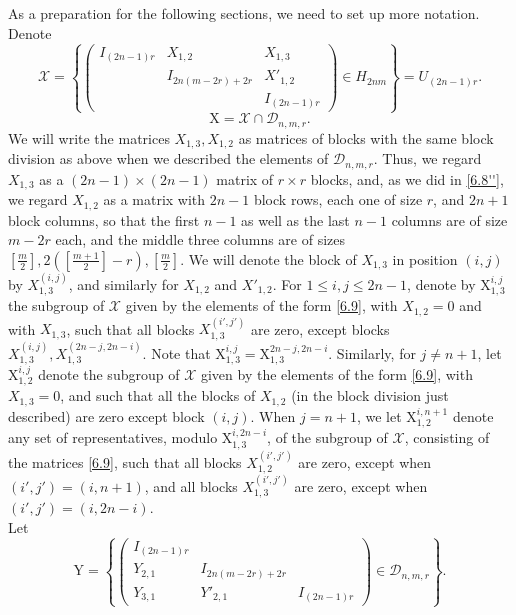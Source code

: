 \documentclass[12pts]{amsart}
\begin{document}
As a preparation for the following sections, we need to set
up more notation. Denote
\begin{equation}\label{6.9}
\mathcal{X}=\left\{\begin{pmatrix}I_{(2n-1)r}&X_{1,2}&X_{1,3}\\&I_{2n(m-2r)+2r}&X'_{1,2}\\
&&I_{(2n-1)r}\end{pmatrix}\in H_{2nm}\right\}=U_{(2n-1)r}.
\end{equation}
$$
\mathrm{X}=\mathcal{X}\cap \mathcal{D}_{n,m,r}.
$$
We will write the matrices $X_{1,3}, X_{1,2}$ as matrices of blocks
with the same block division as above when we described the elements
of $\mathcal{D}_{n,m,r}$. Thus, we regard $X_{1,3}$ as a
$(2n-1)\times (2n-1)$ matrix of $r\times r$ blocks, and, as we did in \eqref{6.8''}, we regard $X_{1,2}$ as
a matrix with $2n-1$ block rows, each one of size $r$, and $2n+1$
block columns, so that the first $n-1$ as well as the last $n-1$
columns are of size $m-2r$ each, and the middle three columns are of
sizes $[\frac{m}{2}], 2([\frac{m+1}{2}]-r), [\frac{m}{2}]$. We will denote the block of $X_{1,3}$ in position $(i,j)$ by $X_{1,3}^{(i,j)}$, and similarly for $X_{1,2}$ and
$X'_{1,2}$. For $1\leq i,j\leq 2n-1$, denote by
$\mathrm{X}_{1,3}^{i,j}$ the subgroup of $\mathcal{X}$ given by the
elements of the form \eqref{6.9}, with $X_{1,2}=0$ and with
$X_{1,3}$, such that all blocks $X_{1,3}^{(i',j')}$ are zero, except
blocks $X_{1,3}^{(i,j)}, X_{1,3}^{(2n-j,2n-i)}$. Note that $\mathrm{X}_{1,3}^{i,j}=\mathrm{X}_{1,3}^{2n-j,2n-i}$. Similarly, for $j\neq n+1$, let
$\mathrm{X}_{1,2}^{i,j}$ denote the subgroup of $\mathcal{X}$ given by
the elements of the form \eqref{6.9}, with $X_{1,3}=0$, and such
that all the blocks of $X_{1,2}$ (in the block division just
described) are zero except block $(i,j)$. When $j=n+1$, we let  $\mathrm{X}_{1,2}^{i,n+1}$ 
denote any set of representatives, modulo $\mathrm{X}_{1,3}^{i,2n-i}$, of the subgroup of $\mathcal{X}$,
consisting of the matrices \eqref{6.9}, such that all blocks $X_{1,2}^{(i',j')}$ are zero,
except when $(i',j')=(i,n+1)$, and all blocks $X_{1,3}^{(i',j')}$ are zero, except when $(i',j')=(i,2n-i)$.
 \\
Let
\begin{equation}\label{6.10}
\mathrm{Y}=\left\{\begin{pmatrix}I_{(2n-1)r}\\Y_{2,1}&I_{2n(m-2r)+2r}\\
Y_{3,1}&Y'_{2,1}&I_{(2n-1)r}\end{pmatrix}\in
\mathcal{D}_{n,m,r}\right\}.
\end{equation}
\end{document}
